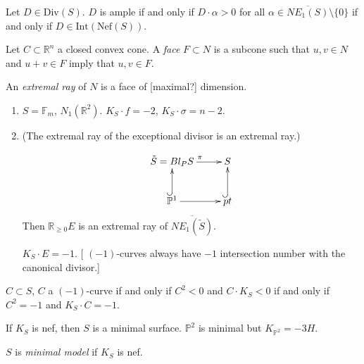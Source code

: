 \begin{theorem}
\label{theorem-kleimann}
Let $D \in \text{Div}(S)$.
$D$ is ample if and only if $D\cdot \alpha>0$
for all
$\alpha \in \overline{NE_1(S)}\setminus\{0\}$
if and only if $D \in
\text{Int}(\text{Nef}(S))$.
\end{theorem}

\begin{definition}
\label{definition-face-extremal-rays}
Let $C \subset \mathbb{R}^n$ a closed convex
cone.
A {\it face} $F \subset N$ is a subcone such
that
$u,v \in N$ and $u+v \in F$ imply
that $u,v \in F$.

An {\it extremal ray} of $N$ is a face of
[maximal?] dimension.
\end{definition}

\begin{example}
\label{example-cone}
\begin{enumerate}
\item
$S= \mathbb{F}_m$,
$N_1(\mathbb{R}^2)$.
$K_S \cdot f=-2$,
$K_S \cdot \sigma=n-2$.

\item (The extremal ray of the exceptional
divisor
is an extremal ray.)

$$
\xymatrix{
\tilde{S}=Bl_PS\ar[r]^{\pi}
&S\\
\mathbb{P}^1\ar[r]\ar@{^{(}->}[u]
&pt\ar@{^{(}->}[u].
}
$$
Then $\mathbb{R}_{\geq 0}E$ is an extremal
ray of $\overline{NE_1(\tilde{S})}$.

$K_S\cdot E=-1$.
[ $(-1)$-curves always have $-1$ intersection
number with the canonical
divisor.]
\end{enumerate}
\end{example}

\begin{exercise}
\label{exercise-adjunction-again}
$C \subset S$, $C$ a $(-1)$-curve if and only
if
$C^2 <0$ and $C\cdot K_S<0$
if and only if $C^2=-1$ and  $K_S\cdot C=-1$.
\end{exercise}

\begin{remark}
\label{remark-minimal-surface}
If $K_S$ is nef, then  $S$ is a minimal
surface.
$\mathbb{P}^2$ is minimal but
$K_{\mathbb{P}^2}=-3H$.
\end{remark}

\begin{definition}
\label{definition-minimal-model}
$S$ is  {\it minimal model} if $K_S$ is nef.
\end{definition}

